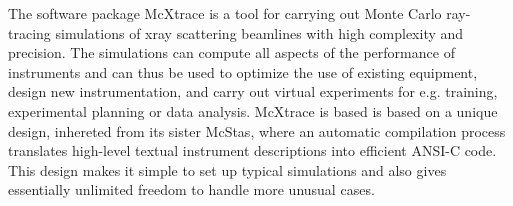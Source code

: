 The software package McXtrace is a tool for carrying out Monte Carlo
ray-tracing simulations of xray scattering beamlines with high
complexity and precision. The simulations can compute all aspects of the
performance of instruments and can thus be used to optimize the use of
existing equipment, design new instrumentation, and carry out virtual
experiments for e.g. training, experimental planning or data analysis. 
McXtrace is based is based on a unique design, inhereted from its sister McStas, 
where an automatic compilation process
translates high-level textual instrument descriptions into efficient
ANSI-C code. This design makes it simple to set up typical simulations
and also gives essentially unlimited freedom to handle more unusual
cases.
